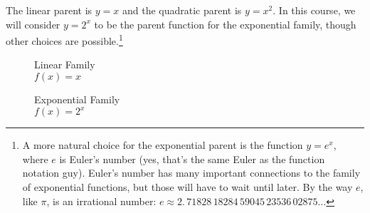 The linear parent is $y=x$ and the quadratic parent is $y=x^2$. In this course, we will consider $y=2^x$ to be the parent function for the exponential family, though other choices are possible.\footnote{A more natural choice for the exponential parent is the function $y=e^x$, where $e$ is Euler's number (yes, that's the same Euler as the function notation guy). Euler's number has many important connections to the family of exponential functions, but those will have to wait until later. By the way $e$, like $\pi$, is an irrational number: $e \approx 2.\, 71828\, 18284\, 59045\, 23536\, 02875\dotso$}

\begin{figure}
\bigskip
\begin{minipage}{0.32\linewidth}
\centering
Linear Family
\\ $f(x)=x$\par\medskip
{}
\end{minipage}
\begin{minipage}{0.32\linewidth}
\centering
Exponential Family
\\ $f(x)=2^x$\par\medskip
{}
\end{minipage}
\end{figure}
